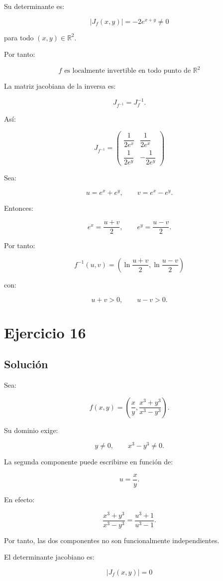\documentclass[11pt,a4paper]{article}
\newcommand{\R}{\mathbb{R}}
\begin{document}
Su determinante es:

\[
|J_f(x,y)|
=
-2e^{x+y}\neq0
\]

para todo \((x,y)\in\R^2\).

Por tanto:

\[
\boxed{
f\text{ es localmente invertible en todo punto de }\R^2
}
\]

La matriz jacobiana de la inversa es:

\[
J_{f^{-1}}
=
J_f^{-1}.
\]

Así:

\[
\boxed{
J_{f^{-1}}
=
\begin{pmatrix}
\dfrac1{2e^x}&\dfrac1{2e^x}\\[2mm]
\dfrac1{2e^y}&-\dfrac1{2e^y}
\end{pmatrix}
}
\]

Sea:

\[
u=e^x+e^y,
\qquad
v=e^x-e^y.
\]

Entonces:

\[
e^x=\frac{u+v}{2},
\qquad
e^y=\frac{u-v}{2}.
\]

Por tanto:

\[
\boxed{
f^{-1}(u,v)
=
\left(
\ln\frac{u+v}{2},
\ln\frac{u-v}{2}
\right)
}
\]

con:

\[
u+v>0,
\qquad
u-v>0.
\]

\section{Ejercicio 16}
\subsection{Solución}

Sea:

\[
f(x,y)
=
\left(
\frac{x}{y},
\frac{x^3+y^3}{x^3-y^3}
\right).
\]

Su dominio exige:

\[
y\neq0,
\qquad
x^3-y^3\neq0.
\]

La segunda componente puede escribirse en función de:

\[
u=\frac{x}{y}.
\]

En efecto:

\[
\frac{x^3+y^3}{x^3-y^3}
=
\frac{u^3+1}{u^3-1}.
\]

Por tanto, las dos componentes no son funcionalmente independientes.

El determinante jacobiano es:

\[
\boxed{
|J_f(x,y)|=0
}
\]
\end{document}

